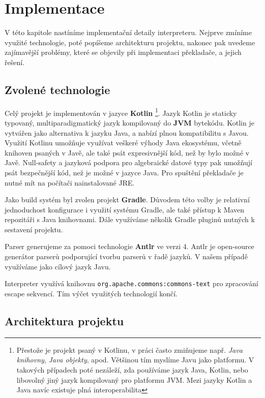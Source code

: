 \chapter{Implementace}

V této kapitole nastíníme implementační detaily interpreteru. Nejprve zmíníme využité technologie,
poté popíšeme architekturu projektu, nakonec pak uvedeme zajímavější problémy, které se objevily
při implementaci překladače, a jejich řešení.

\section{Zvolené technologie}

Celý projekt je implementován v jazyce \textbf{Kotlin} \footnote{Přestože je projekt psaný
  v Kotlinu, v práci často zmiňujeme např. \textit{Java knihovny}, \textit{Java objekty}, apod.
  Většinou tím myslíme Javu jako platformu. V takových případech poté nezáleží, zda
  používáme jazyk Java, Kotlin, nebo libovolný jiný jazyk kompilovaný pro platformu JVM.
  Mezi jazyky Kotlin a Java navíc existuje plná interoperabilita}.
Jazyk Kotlin je staticky typovaný, multiparadigmatický jazyk kompilovaný do \textbf{JVM} bytekódu.
Kotlin je vytvářen jako alternativa k jazyku Java, a nabízí plnou kompatibilitu s Javou. Využití
Kotlinu umožňuje využívat veškeré výhody Java ekosystému, včetně knihoven psaných v Javě, ale také
psát expresivnější kód, než by bylo možné v Javě. Null-safety a jazyková podpora pro algebraické
datové typy pak umožňují psát bezpečnější kód, než je možné v jazyce Java. Pro spuštění překladače
je nutné mít na počítači nainstalované JRE.

Jako build systém byl zvolen projekt \textbf{Gradle}. Důvodem této volby je relativní jednoduchost
konfigurace i využití systému Gradle, ale také přístup k Maven repozitáři s Java knihovnami. Dále
využíváme několik Gradle pluginů nutných k sestavení projektu.

Parser generujeme za pomoci technologie \textbf{Antlr} ve verzi 4. Antlr je open-source generátor
parserů podporující tvorbu parserů v řadě jazyků. V našem případě využíváme jako cílový jazyk
Javu.

Interpreter využívá knihovnu \lstinline{org.apache.commons:commons-text} pro zpracování escape
sekvencí. Tím výčet využitých technologií končí.

\section{Architektura projektu}

